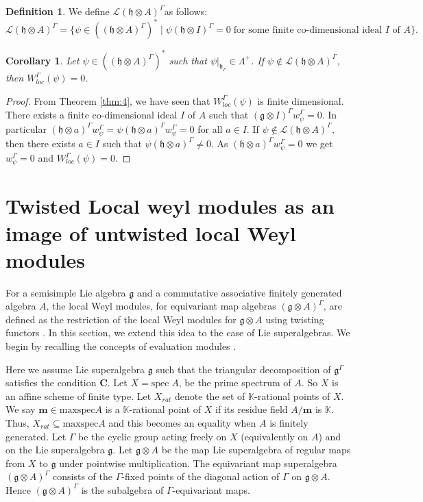 \documentclass[11pt]{amsart}
\theoremstyle{plain}
\newtheorem{cor}[thm]{Corollary}
\theoremstyle{definition}
\newtheorem{defn}[thm]{Definition}
\newcommand{\g}{\mathfrak{g}}
\newcommand{\h}{\mathfrak{h}}
\newcommand{\lw}{w_{\psi}^{\Gamma}}
\newcommand{\LW}{W_{loc}^{\Gamma}(\psi)}
\begin{document}
\begin{defn} We define $\mathcal{L}(\h\otimes A)^{\Gamma}$\label{def:8} as follows:
    \[\mathcal{L}(\h\otimes A)^{\Gamma}=\{\psi\in((\h\otimes A)^{\Gamma})^{*}\mid \psi(\h\otimes I)^{\Gamma}=0\; \mbox{for some finite co-dimensional ideal $I$ of $A$}\}.\]
\end{defn}
\begin{cor}
    Let $\psi\in((\h\otimes A)^{\Gamma})^{*}$ such that $\psi|_{\h_{\Gamma}}\in\Lambda^{+}$. If $\psi\notin\mathcal{L}(\h\otimes A)^{\Gamma}$, then $\LW=0$.
\end{cor}
\begin{proof}
From Theorem \ref{thm:4}, we have seen that $\LW$ is finite dimensional. There exists a finite co-dimensional ideal $I$ of $A$ such that $(\g\otimes I)^{\Gamma}\lw=0$. In particular $(\h\otimes a)^{\Gamma}\lw=\psi(\h\otimes a)^{\Gamma}\lw=0$ for all $a\in I$. If $\psi\notin\mathcal{L}(\h\otimes A)^{\Gamma},$ then there exists $a\in I$ such that $\psi(\h\otimes a)^{\Gamma}\neq 0$. As $(\h\otimes a)^{\Gamma}\lw=0$ we get $\lw=0$ and $\LW=0$.
\end{proof}

\section{Twisted Local weyl modules as an image of untwisted local Weyl modules}\label{sec:9}
For a semisimple Lie algebra $\g$ and a commutative associative finitely generated algebra $A$, the local Weyl modules, for equivariant map algebras $(\g\otimes A)^{\Gamma}$, are defined as the restriction of the local Weyl modules for $\g\otimes A$ using twisting functors \cite{FKKS12}.
In this section, we extend this idea to the case of Lie superalgebras. We begin by recalling the concepts of evaluation modules \cite{Sav14}.

Here we assume Lie superalgebra $\g$ such that the triangular decomposition of $\g^{\Gamma}$ satisfies the condition $\mathbf{C}$. Let $X=\mbox{spec}\; A$, be the prime spectrum of $A$. So $X$ is an affine scheme of finite type. Let $X_{rat}$ denote the set of $\mathbb{K}$-rational points of $X$. We say $\textbf{m}\in\mbox{maxspec}A$ is a $\mathbb{K}$-rational point of $X$ if its residue field $A/\textbf{m}$ is $\mathbb{K}$. Thus, $X_{rat}\subseteq\mbox{maxspec}A$ and this becomes an equality when $A$ is finitely generated. Let $\Gamma$ be the cyclic group acting freely on $X$ (equivalently on $A$) and on the Lie superalgebra $\g$. Let $\g\otimes A$ be the map Lie superalgebra of regular maps from $X$ to $\g$ under pointwise multiplication. The equivariant map superalgebra $(\g\otimes A)^{\Gamma}$ consists of the $\Gamma$-fixed points of the diagonal action of $\Gamma$ on $\g\otimes A$. Hence $(\g\otimes A)^{\Gamma}$ is the subalgebra of $\Gamma$-equivariant maps. 
\end{document}
